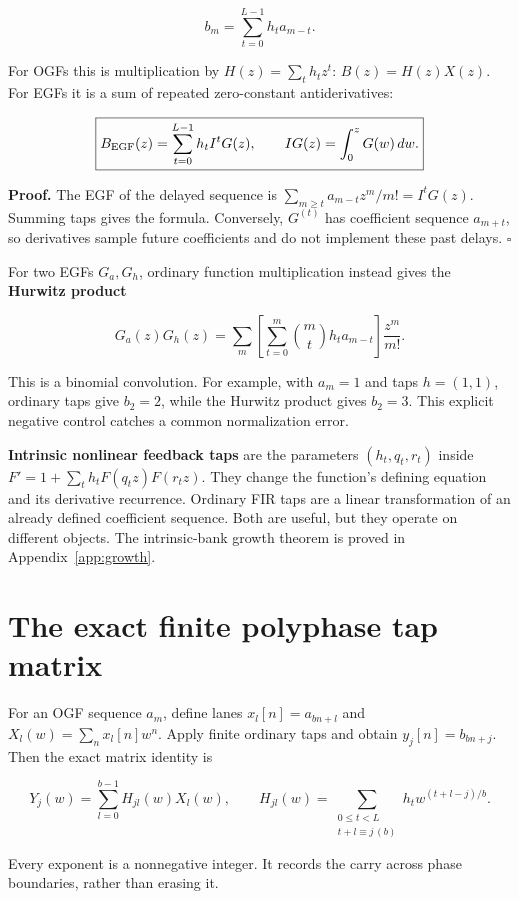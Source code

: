 \[
b_m=\sum_{t=0}^{L-1}h_ta_{m-t}.
\]

For OGFs this is multiplication by \(H(z)=\sum_th_tz^t\):
\(B(z)=H(z)X(z)\). For EGFs it is a sum of repeated zero-constant
antiderivatives:

\[
\boxed{B_{\rm EGF}(z)=\sum_{t=0}^{L-1}h_t I^tG(z),\qquad
IG(z)=\int_0^zG(w)\,dw.}
\]

\textbf{Proof.} The EGF of the delayed sequence is
\(\sum_{m\ge t}a_{m-t}z^m/m!=I^tG(z)\). Summing taps gives the formula.
Conversely, \(G^{(t)}\) has coefficient sequence \(a_{m+t}\), so
derivatives sample future coefficients and do not implement these past
delays. \(\square\)

For two EGFs \(G_a,G_h\), ordinary function multiplication instead gives
the \textbf{Hurwitz product}

\[
G_a(z)G_h(z)=\sum_m\left[
\sum_{t=0}^m\binom mt h_ta_{m-t}\right]\frac{z^m}{m!}.
\]

This is a binomial convolution. For example, with \(a_m=1\) and taps
\(h=(1,1)\), ordinary taps give \(b_2=2\), while the Hurwitz product
gives \(b_2=3\). This explicit negative control catches a common
normalization error.

\textbf{Intrinsic nonlinear feedback taps} are the parameters
\((h_t,q_t,r_t)\) inside \(F'=1+\sum_th_tF(q_tz)F(r_tz)\). They change
the function's defining equation and its derivative recurrence. Ordinary
FIR taps are a linear transformation of an already defined coefficient
sequence. Both are useful, but they operate on different objects. The
intrinsic-bank growth theorem is proved in Appendix~\ref{app:growth}.

\hypertarget{the-exact-finite-polyphase-tap-matrix}{%
\section{The exact finite polyphase tap
matrix}\label{the-exact-finite-polyphase-tap-matrix}}

For an OGF sequence \(a_m\), define lanes \(x_l[n]=a_{bn+l}\) and
\(X_l(w)=\sum_nx_l[n]w^n\). Apply finite ordinary taps and obtain
\(y_j[n]=b_{bn+j}\). Then the exact matrix identity is

\[
\boxed{Y_j(w)=\sum_{l=0}^{b-1}H_{jl}(w)X_l(w),\qquad
H_{jl}(w)=\sum_{\substack{0\le t<L\\t+l\equiv j\,(b)}}
h_t w^{(t+l-j)/b}.}
\]

Every exponent is a nonnegative integer. It records the carry across
phase boundaries, rather than erasing it.

